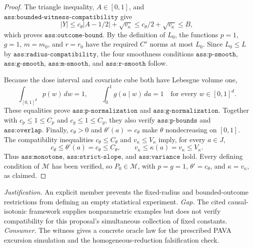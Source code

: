 \documentclass{article}
\begin{document}
\begin{proof}
The triangle inequality, \(A\in[0,1]\), and \(\texttt{ass:bounded-witness-compatibility}\) give
\[
|Y|
\le c_{\theta}|A-1/2|+\sqrt{v_{\kappa}}
\le c_{\theta}/2+\sqrt{v_{\kappa}}
\le B,
\]
which proves \(\texttt{ass:outcome-bound}\). By the definition of \(L_0\), the functions \(p=1\), \(g=1\), \(m=m_0\), and \(r=r_0\) have the required \(C^s\) norms at most \(L_0\). Since \(L_0\le L\) by \(\texttt{ass:radius-compatibility}\), the four smoothness conditions \(\texttt{ass:p-smooth}\), \(\texttt{ass:g-smooth}\), \(\texttt{ass:m-smooth}\), and \(\texttt{ass:r-smooth}\) follow.

Because the dose interval and covariate cube both have Lebesgue volume one,
\[
\int_{[0,1]^d}p(w)\,dw=1,
\qquad
\int_0^1g(a\mid w)\,da=1
\quad\text{for every }w\in[0,1]^d.
\]
These equalities prove \(\texttt{ass:p-normalization}\) and \(\texttt{ass:g-normalization}\). Together with \(c_p\le1\le C_p\) and \(c_g\le1\le C_g\), they also verify \(\texttt{ass:p-bounds}\) and \(\texttt{ass:overlap}\). Finally, \(c_{\theta}>0\) and \(\theta'(a)=c_{\theta}\) make \(\theta\) nondecreasing on \([0,1]\). The compatibility inequalities \(c_{\theta}\le C_{\theta}\) and \(v_{\kappa}\le V_{\kappa}\) imply, for every \(a\in J\),
\[
c_{\theta}\le\theta'(a)=c_{\theta}\le C_{\theta},
\qquad
v_{\kappa}\le\kappa(a)=v_{\kappa}\le V_{\kappa}.
\]
Thus \(\texttt{ass:monotone}\), \(\texttt{ass:strict-slope}\), and \(\texttt{ass:variance}\) hold. Every defining condition of \(\mathcal M\) has been verified, so \(P_0\in\mathcal M\), with \(p=g=1\), \(\theta'=c_{\theta}\), and \(\kappa=v_{\kappa}\), as claimed.
\end{proof}
\par\smallskip\noindent \textit{Justification.} An explicit member prevents the fixed-radius and bounded-outcome restrictions from defining an empty statistical experiment. \textit{Gap.} The cited causal-isotonic framework supplies nonparametric examples but does not verify compatibility for this proposal's simultaneous collection of fixed constants. \textit{Consumer.} The witness gives a concrete oracle law for the prescribed PAVA excursion simulation and the homogeneous-reduction falsification check.
\end{document}
